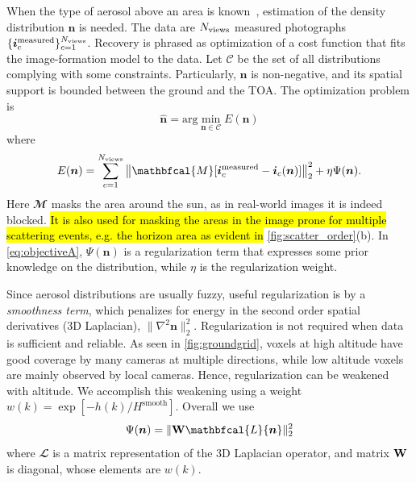 \documentclass[10pt,letterpaper]{article}
\newcommand{\argmin}{\mathrm{arg}\min}
\newcommand{\vect}[1]{\bm{#1}}
\newcommand{\MaskSun}{\mathbfcal{M}}
\newcommand{\Laplacian}{\mathbfcal{L}}
\newcommand{\DistSet}{\mathcal{C}}
\newcommand{\DistUnknown}{\vect{n}}
\newcommand{\DistEstimated}{\hat{\vect{n}}}
\newcommand{\CostFunc}[1]{E(#1)}
\begin{document}
When the type of aerosol above an area is known~\cite{Martonchik2009},
estimation of the density distribution $\DistUnknown$ is needed. The
data are $N_{\rm views}$ measured photographs $\{ {\bm i}^{\rm
  measured}_c\}_{c=1}^{N_{\rm views}}$. Recovery is phrased as
optimization of a cost function that fits the image-formation model to
the data. Let $\DistSet$ be the set of all distributions complying
with some constraints.  Particularly, $\DistUnknown$ is non-negative,
and its spatial support is bounded between the ground and the TOA. The
optimization problem is
\begin{equation}
  \label{eq:minobjectiveA}
  \DistEstimated =
  \argmin_{\DistUnknown \in \DistSet} \CostFunc{\DistUnknown}
\end{equation}
where
\begin{equation}
  \label{eq:objectiveA}
  \CostFunc{\DistUnknown}
  = \sum_{c=1}^{N_{\rm views}}
  \left\|
    \MaskSun[{\bm i}^{\rm measured}_c - {\bm i}_c({\bm n})]
  \right\|^2_2  + \eta \Psi({\bm n}).
\end{equation}
Here $\MaskSun$ masks the area around the sun, as in real-world images
it is indeed blocked. \hl{It is also used for masking the areas in the image
prone for multiple scattering events, e.g. the horizon area as evident in}
\cref{fig:scatter_order}(b).  In \cref{eq:objectiveA}, $\Psi({\bm n})$
is a regularization term that expresses some prior knowledge on the
distribution, while $\eta$ is the regularization weight.

Since aerosol distributions are usually fuzzy, useful regularization
is by a {\em smoothness term}, which penalizes for energy in the second order
spatial derivatives (3D Laplacian), $\| \nabla^2{\bm
  n}\|^2_2$. Regularization is not required when data is sufficient
and reliable. As seen in \cref{fig:groundgrid}, voxels at high
altitude have good coverage by many cameras at multiple directions,
while low altitude voxels are mainly observed by local
cameras. Hence, regularization can be weakened with altitude. We
accomplish this weakening using a weight
$w(k)=\exp\left[-h(k)/H^\mathrm{smooth}\right]$.  Overall we use
\begin{equation}
  \label{eq:regularizer}
  \Psi({\bm n}) = \| {\bf W} \Laplacian{\bm n}\|^2_2
\end{equation}
where $\Laplacian$ is a matrix representation of the 3D Laplacian
operator, and matrix ${\bf W}$ is diagonal, whose elements are $w(k)$.
\end{document}
